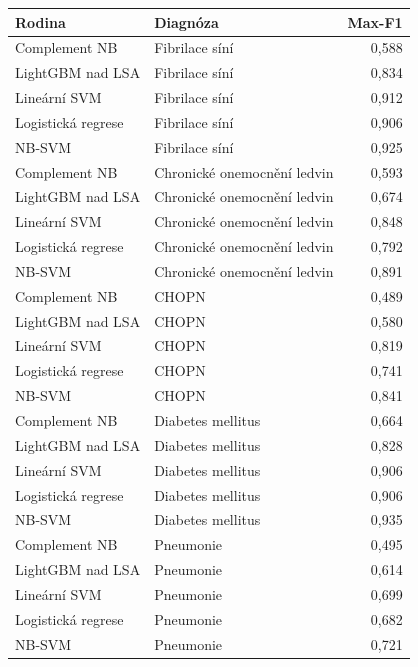 \begin{tabular}{llr}
\toprule
Rodina & Diagnóza & Max-F1\\
\midrule
Complement NB & Fibrilace síní & 0,588\\
LightGBM nad LSA & Fibrilace síní & 0,834\\
Lineární SVM & Fibrilace síní & 0,912\\
Logistická regrese & Fibrilace síní & 0,906\\
NB-SVM & Fibrilace síní & 0,925\\
Complement NB & Chronické onemocnění ledvin & 0,593\\
LightGBM nad LSA & Chronické onemocnění ledvin & 0,674\\
Lineární SVM & Chronické onemocnění ledvin & 0,848\\
Logistická regrese & Chronické onemocnění ledvin & 0,792\\
NB-SVM & Chronické onemocnění ledvin & 0,891\\
Complement NB & CHOPN & 0,489\\
LightGBM nad LSA & CHOPN & 0,580\\
Lineární SVM & CHOPN & 0,819\\
Logistická regrese & CHOPN & 0,741\\
NB-SVM & CHOPN & 0,841\\
Complement NB & Diabetes mellitus & 0,664\\
LightGBM nad LSA & Diabetes mellitus & 0,828\\
Lineární SVM & Diabetes mellitus & 0,906\\
Logistická regrese & Diabetes mellitus & 0,906\\
NB-SVM & Diabetes mellitus & 0,935\\
Complement NB & Pneumonie & 0,495\\
LightGBM nad LSA & Pneumonie & 0,614\\
Lineární SVM & Pneumonie & 0,699\\
Logistická regrese & Pneumonie & 0,682\\
NB-SVM & Pneumonie & 0,721\\
\bottomrule
\end{tabular}
